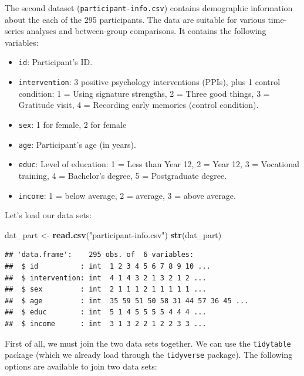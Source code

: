 \documentclass[
]{article}
\newenvironment{Shaded}{\begin{snugshade}}{\end{snugshade}}
\newcommand{\FunctionTok}[1]{\textcolor[rgb]{0.13,0.29,0.53}{\textbf{#1}}}
\newcommand{\NormalTok}[1]{#1}
\newcommand{\OtherTok}[1]{\textcolor[rgb]{0.56,0.35,0.01}{#1}}
\newcommand{\StringTok}[1]{\textcolor[rgb]{0.31,0.60,0.02}{#1}}
\providecommand{\tightlist}{%
  \setlength{\itemsep}{0pt}\setlength{\parskip}{0pt}}
\begin{document}
The second dataset (\texttt{participant-info.csv}) contains demographic
information about the each of the 295 participants. The data are
suitable for various time-series analyses and between-group comparisons.
It contains the following variables:

\begin{itemize}
\tightlist
\item
  \texttt{id}: Participant's ID.
\item
  \texttt{intervention}: 3 positive psychology interventions (PPIs),
  plus 1 control condition: 1 = Using signature strengths, 2 = Three
  good things, 3 = Gratitude visit, 4 = Recording early memories
  (control condition).
\item
  \texttt{sex}: 1 for female, 2 for female
\item
  \texttt{age}: Participant's age (in years).
\item
  \texttt{educ}: Level of education: 1 = Less than Year 12, 2 = Year 12,
  3 = Vocational training, 4 = Bachelor's degree, 5 = Postgraduate
  degree.
\item
  \texttt{income}: 1 = below average, 2 = average, 3 = above average.
\end{itemize}

Let's load our data sets:

\begin{Shaded}
\begin{Highlighting}[]
\NormalTok{dat\_part }\OtherTok{\textless{}{-}} \FunctionTok{read.csv}\NormalTok{(}\StringTok{"participant{-}info.csv"}\NormalTok{)}
\FunctionTok{str}\NormalTok{(dat\_part)}
\end{Highlighting}
\end{Shaded}

\begin{verbatim}
## 'data.frame':    295 obs. of  6 variables:
##  $ id          : int  1 2 3 4 5 6 7 8 9 10 ...
##  $ intervention: int  4 1 4 3 2 1 3 2 1 2 ...
##  $ sex         : int  2 1 1 1 2 1 1 1 1 1 ...
##  $ age         : int  35 59 51 50 58 31 44 57 36 45 ...
##  $ educ        : int  5 1 4 5 5 5 5 4 4 4 ...
##  $ income      : int  3 1 3 2 2 1 2 2 3 3 ...
\end{verbatim}

First of all, we must join the two data sets together. We can use the
\texttt{tidytable} package (which we already load through the
\texttt{tidyverse} package). The following options are available to join
two data sets:
\end{document}

